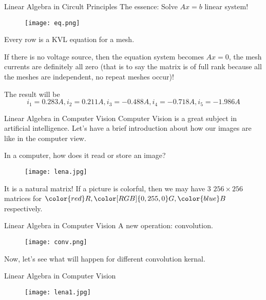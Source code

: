 \documentclass{beamer}
\begin{document}
\begin{frame}{Linear Algebra in Circult Principles}
The essence: Solve $Ax=b$ linear system!
\begin{figure}
    \centering
    \texttt{[image: eq.png]}
\end{figure}

Every row is a KVL equation for a mesh.

\vspace{3pt}
If there is no voltage source, then the equation system becomes $Ax=0$, the mesh currents are definitely all zero (that is to say the matrix is of full rank because all the meshes are independent, no repeat meshes occur)!

\vspace{3pt}
The result will be
\begin{equation*}
    i_1=0.283A,i_2=0.211A,i_3=-0.488A,i_4=-0.718A,i_5=-1.986A
\end{equation*}

\end{frame}



\begin{frame}{Linear Algebra in Computer Vision}
Computer Vision is a great subject in artificial intelligence. Let's have a brief introduction about how our images are like in the computer view.

\vspace{3pt}
In a computer, how does it read or store an image?

\begin{figure}
    \centering
    \texttt{[image: lena.jpg]}
\end{figure}
\vspace{-8pt}
It is a natural matrix! If a picture is colorful, then we may have 3 $256\times 256$ matrices for ${\color{red} R}, {\color[RGB]{0, 255, 0} G}, {\color{blue} B}$ respectively.
\end{frame}

\begin{frame}{Linear Algebra in Computer Vision}
A new operation: convolution.

\begin{figure}
    \centering
    \texttt{[image: conv.png]}
\end{figure}

Now, let's see what will happen for different convolution kernal.
\end{frame}

\begin{frame}{Linear Algebra in Computer Vision}

\begin{figure}
    \centering
    \texttt{[image: lena1.jpg]}
\end{figure}

\end{frame}
\end{document}
